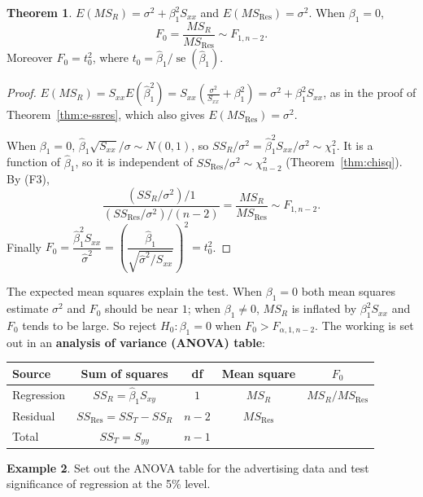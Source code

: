 \documentclass[11pt,a4paper]{article}
\numberwithin{equation}{section}
\theoremstyle{definition}
\newtheorem{thm}{Theorem}[subsection]
\newtheorem{exa}[thm]{Example}
\begin{document}
\begin{thm}\label{thm:F}
$E(MS_R) = \sigma^2 + \beta_1^2 S_{xx}$ and $E(MS_{\mathrm{Res}}) = \sigma^2$. When
$\beta_1 = 0$,
\[
F_0 = \frac{MS_R}{MS_{\mathrm{Res}}} \sim F_{1, n-2} .
\]
Moreover $F_0 = t_0^2$, where $t_0 = \hat\beta_1 / \operatorname{se}(\hat\beta_1)$.
\end{thm}

\begin{proof}
$E(MS_R) = S_{xx} E(\hat\beta_1^2) = S_{xx}\left( \frac{\sigma^2}{S_{xx}} + \beta_1^2 \right)
= \sigma^2 + \beta_1^2 S_{xx}$, as in the proof of Theorem~\ref{thm:e-ssres}, which also gives
$E(MS_{\mathrm{Res}}) = \sigma^2$.

When $\beta_1 = 0$, $\hat\beta_1 \sqrt{S_{xx}}/\sigma \sim N(0,1)$, so
$SS_R/\sigma^2 = \hat\beta_1^2 S_{xx}/\sigma^2 \sim \chi^2_1$. It is a function of
$\hat\beta_1$, so it is independent of $SS_{\mathrm{Res}}/\sigma^2 \sim \chi^2_{n-2}$
(Theorem~\ref{thm:chisq}). By (F3),
\[
\frac{(SS_R/\sigma^2)/1}{(SS_{\mathrm{Res}}/\sigma^2)/(n-2)} = \frac{MS_R}{MS_{\mathrm{Res}}} \sim F_{1, n-2} .
\]
Finally
$F_0 = \dfrac{\hat\beta_1^2 S_{xx}}{\hat\sigma^2} = \left( \dfrac{\hat\beta_1}{\sqrt{\hat\sigma^2/S_{xx}}} \right)^2 = t_0^2$.
\end{proof}

The expected mean squares explain the test. When $\beta_1 = 0$ both mean squares estimate
$\sigma^2$ and $F_0$ should be near $1$; when $\beta_1 \neq 0$, $MS_R$ is inflated by
$\beta_1^2 S_{xx}$ and $F_0$ tends to be large. So reject $H_0\colon \beta_1 = 0$ when
$F_0 > F_{\alpha, 1, n-2}$. The working is set out in an \textbf{analysis of variance
(ANOVA) table}:
\begin{center}
\begin{tabular}{lcccc}
\hline
Source & Sum of squares & df & Mean square & $F_0$ \\
\hline
Regression & $SS_R = \hat\beta_1 S_{xy}$ & $1$ & $MS_R$ & $MS_R / MS_{\mathrm{Res}}$ \\
Residual & $SS_{\mathrm{Res}} = SS_T - SS_R$ & $n-2$ & $MS_{\mathrm{Res}}$ & \\
\hline
Total & $SS_T = S_{yy}$ & $n-1$ & & \\
\hline
\end{tabular}
\end{center}

\begin{exa}\label{exa:disney-anova}
Set out the ANOVA table for the advertising data and test significance of regression at the
5\% level.
\end{exa}
\end{document}
